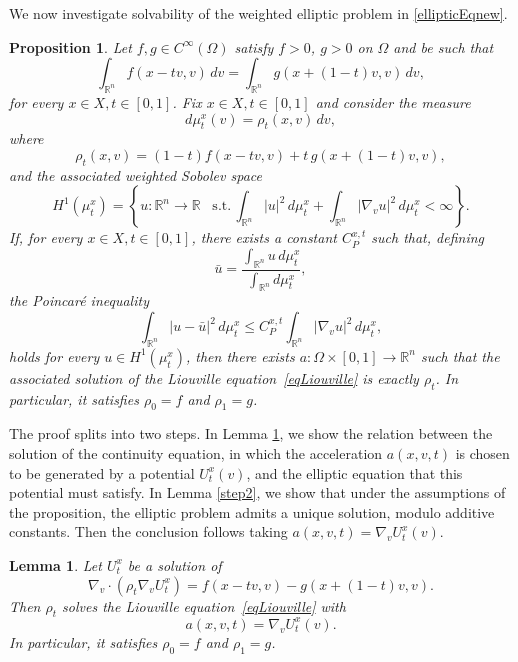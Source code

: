 \documentclass[11pt]{article}
\newtheorem{lemma}{Lemma}[section]
\newtheorem{proposition}{Proposition}[section]
\newcommand{\R}{{\mathbb R}}
\begin{document}
We now investigate solvability of the weighted elliptic problem in \eqref{ellipticEqnew}. 
\begin{proposition}
Let $f,g\in C^\infty(\Omega)$ satisfy
$f>0$, $g>0$ on $\Omega$ and be such that
\[
\int_{\R^n} f(x-tv,v)\,dv = \int_{\R^n} g(x+(1-t)v,v)\,dv,
\]
for every $x\in X,t\in [0,1]$. 
Fix $x\in X,t\in [0,1]$ and consider  the measure 
\begin{equation}\label{measure}
d\mu_t^x(v)
=
\rho_t(x,v)\,dv ,
\end{equation}
where
\[
\rho_t(x,v)
=
(1-t)f(x-tv,v)
+
t\,g(x+(1-t)v,v),
\]
and the associated weighted Sobolev space
\begin{equation}\label{wsob}
H^1(\mu_t^x)
=
\left\{
u :\R^n \to \R \,\,\,\,\, \mathrm{s.t.}\,
\int_{\R^n} |u|^2\,d\mu_t^x
+
\int_{\R^n} |\nabla_v u|^2\,d\mu_t^x
<
\infty
\right\}.
\end{equation}
If, for every $x\in X, t\in[0,1]$, there exists a constant $C_P^{x,t}$ such that, defining 
\[
\bar u
=
\frac{\int_{\R^n} u\,d\mu_t^x}
{\int_{\R^n} d\mu_t^x},
\]
the Poincar\'e inequality 
\begin{equation}
\int_{\R^n}
|u-\bar u|^2\,d\mu_t^x
\le
C_P^{x,t}
\int_{\R^n}
|\nabla_v u|^2\,d\mu_t^x ,
\label{ePFinequality}
\end{equation}
holds for every $u \in H^1(\mu_t^x)$, then
there exists $a:\Omega \times [0,1] \to  \R^n$ such that the associated solution 
of the Liouville equation~\eqref{eqLiouville} is exactly $\rho_t$. In particular, it satisfies $\rho_0=f$
and $\rho_1=g$. 
\end{proposition}

The proof splits into two steps. In Lemma \ref{step1}, we show the relation between the solution of the continuity equation, in which the acceleration $a(x,v,t)$ is chosen to be generated by a potential $U_t^x(v)$, and the elliptic equation that this potential must satisfy. In Lemma \ref{step2}, we show that under the assumptions of the proposition, the elliptic problem admits a unique solution, modulo additive constants. Then the conclusion follows taking $a(x,v,t)=\nabla_vU_t^x(v)$. 
\begin{lemma}\label{step1}
Let $U_t^x$ be a solution of  
\[
\nabla_v\cdot(\rho_t\nabla_v U_t^x) = f(x-tv,v)-g(x+(1-t)v,v).
\]
Then $\rho_t$ solves the Liouville equation~\eqref{eqLiouville} with
\[
a(x,v,t)=\nabla_v U_t^x(v).
\]
In particular, it satisfies $\rho_0=f$
and $\rho_1=g$. 
\end{lemma}
\end{document}
